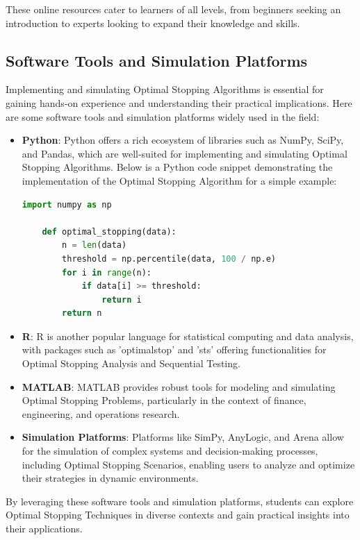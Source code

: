\documentclass[12pt]{book} %
\begin{document}
These online resources cater to learners of all levels, from beginners seeking an introduction to experts looking to expand their knowledge and skills.

\subsection{Software Tools and Simulation Platforms}
Implementing and simulating Optimal Stopping Algorithms is essential for gaining hands-on experience and understanding their practical implications. Here are some software tools and simulation platforms widely used in the field:

\begin{itemize}
    \item \textbf{Python}: Python offers a rich ecosystem of libraries such as NumPy, SciPy, and Pandas, which are well-suited for implementing and simulating Optimal Stopping Algorithms. Below is a Python code snippet demonstrating the implementation of the Optimal Stopping Algorithm for a simple example:
    
    \begin{algorithm}[H]
    \caption{Optimal Stopping Algorithm}
    \begin{lstlisting}[language=Python]
    import numpy as np
    
    def optimal_stopping(data):
        n = len(data)
        threshold = np.percentile(data, 100 / np.e)
        for i in range(n):
            if data[i] >= threshold:
                return i
        return n
    \end{lstlisting}
    \end{algorithm}
    
    \FloatBarrier
    
    \item \textbf{R}: R is another popular language for statistical computing and data analysis, with packages such as 'optimalstop' and 'sts' offering functionalities for Optimal Stopping Analysis and Sequential Testing.
    
    \item \textbf{MATLAB}: MATLAB provides robust tools for modeling and simulating Optimal Stopping Problems, particularly in the context of finance, engineering, and operations research.
    
    \item \textbf{Simulation Platforms}: Platforms like SimPy, AnyLogic, and Arena allow for the simulation of complex systems and decision-making processes, including Optimal Stopping Scenarios, enabling users to analyze and optimize their strategies in dynamic environments.
\end{itemize}

By leveraging these software tools and simulation platforms, students can explore Optimal Stopping Techniques in diverse contexts and gain practical insights into their applications.
\end{document}
